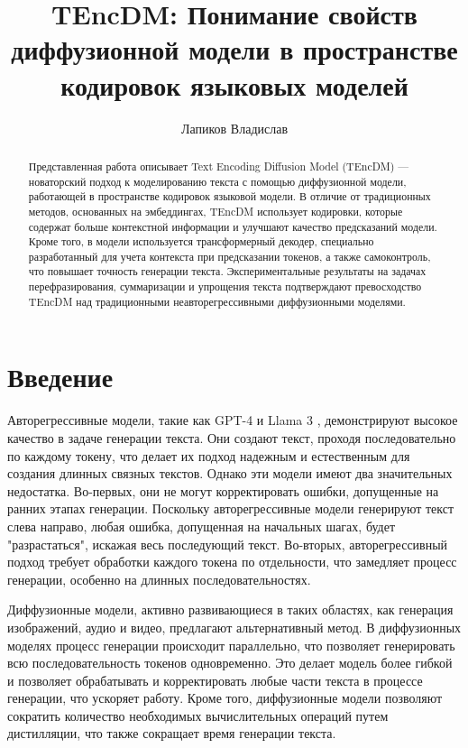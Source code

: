 \documentclass[a4paper, 12pt]{article}
\title{TEncDM: Понимание свойств диффузионной модели в пространстве кодировок языковых моделей}
\author{Лапиков Владислав}
\date{}
\begin{document}
\maketitle

\begin{abstract}
Представленная работа описывает Text Encoding Diffusion Model (TEncDM) — новаторский подход к моделированию текста с помощью диффузионной модели, работающей в пространстве кодировок языковой модели. В отличие от традиционных методов, основанных на эмбеддингах, TEncDM использует кодировки, которые содержат больше контекстной информации и улучшают качество предсказаний модели. Кроме того, в модели используется трансформерный декодер, специально разработанный для учета контекста при предсказании токенов, а также самоконтроль, что повышает точность генерации текста. Экспериментальные результаты на задачах перефразирования, суммаризации и упрощения текста подтверждают превосходство TEncDM над традиционными неавторегрессивными диффузионными моделями.
\end{abstract}

\section{Введение}
Авторегрессивные модели, такие как GPT-4 \cite{gpt4} и Llama 3 \cite{llama3}, демонстрируют высокое качество в задаче генерации текста. Они создают текст, проходя последовательно по каждому токену, что делает их подход надежным и естественным для создания длинных связных текстов. Однако эти модели имеют два значительных недостатка. Во-первых, они не могут корректировать ошибки, допущенные на ранних этапах генерации. Поскольку авторегрессивные модели генерируют текст слева направо, любая ошибка, допущенная на начальных шагах, будет "разрастаться", искажая весь последующий текст. Во-вторых, авторегрессивный подход требует обработки каждого токена по отдельности, что замедляет процесс генерации, особенно на длинных последовательностях.

Диффузионные модели, активно развивающиеся в таких областях, как генерация изображений, аудио и видео, предлагают альтернативный метод. В диффузионных моделях процесс генерации происходит параллельно, что позволяет генерировать всю последовательность токенов одновременно. Это делает модель более гибкой и позволяет обрабатывать и корректировать любые части текста в процессе генерации, что ускоряет работу. Кроме того, диффузионные модели позволяют сократить количество необходимых вычислительных операций путем дистилляции, что также сокращает время генерации текста.
\end{document}
